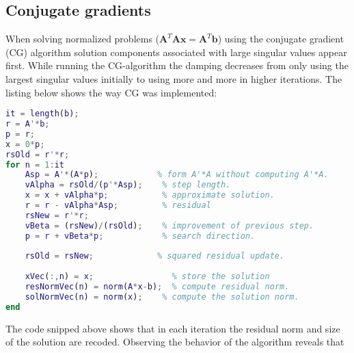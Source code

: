 \subsection{Conjugate gradients}
When solving normalized problems ($\mathbf{A}^T\mathbf{Ax} = \mathbf{A}^T\mathbf{b}$) using the conjugate gradient (CG) algorithm solution components associated with large singular values appear first. While running the CG-algorithm the damping decreases from only using the largest singular values initially to using more and more in higher iterations. The listing below shows the way CG was implemented:
\begin{lstlisting}[language=Matlab]
it = length(b);
r = A'*b;
p = r;
x = 0*p;
rsOld = r'*r;
for n = 1:it
    Asp = A'*(A*p);            % form A'*A without computing A'*A.
    vAlpha = rsOld/(p'*Asp);    % step length.
    x = x + vAlpha*p;           % approximate solution.
    r = r - vAlpha*Asp;         % residual
    rsNew = r'*r;
    vBeta = (rsNew)/(rsOld);    % improvement of previous step.
    p = r + vBeta*p;            % search direction.
    
    rsOld = rsNew;             % squared residual update.
    
    xVec(:,n) = x;                % store the solution
    resNormVec(n) = norm(A*x-b);  % compute residual norm.
    solNormVec(n) = norm(x);    % compute the solution norm.
end
\end{lstlisting}
The code snipped above shows that in each iteration the residual norm and size of the solution are recoded. Observing the behavior of the algorithm reveals that  

